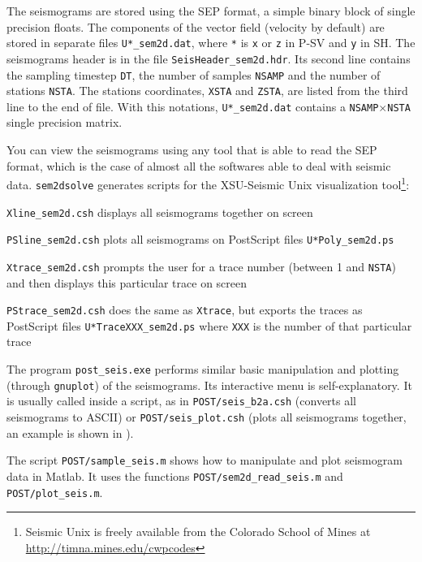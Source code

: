 The seismograms are stored using the SEP format, a simple
binary block of single precision floats. The components 
of the vector field (velocity by default) are stored
in separate files \texttt{U*\_sem2d.dat},
where \texttt{*} is \texttt{x} or \texttt{z} in P-SV 
and \texttt{y} in SH.
The seismograms header is in the file \texttt{SeisHeader\_sem2d.hdr}.
Its second line contains the sampling timestep \texttt{DT}, the
number of samples \texttt{NSAMP} and the number of stations \texttt{NSTA}.
The stations coordinates, \texttt{XSTA} and \texttt{ZSTA}, are listed
from the third line to the end of file.
With this notations, \texttt{U*\_sem2d.dat} contains a 
\texttt{NSAMP}$\times$\texttt{NSTA} single precision matrix.

You can view the seismograms using any tool
that is able to read the SEP format, which is the case of almost
all the softwares able to deal with seismic data.
\texttt{sem2dsolve} generates scripts for the 
XSU-Seismic Unix visualization tool\footnote{Seismic Unix is freely available from the Colorado 
School of Mines at \url{http://timna.mines.edu/cwpcodes}}:

\begin{sitemize}
\item \texttt{Xline\_sem2d.csh} displays all seismograms together on screen
\item \texttt{PSline\_sem2d.csh} plots all seismograms
on PostScript files \texttt{U*Poly\_sem2d.ps}
\item \texttt{Xtrace\_sem2d.csh} prompts the user for a trace number
(between 1 and \texttt{NSTA})
and then displays this particular trace on screen
\item \texttt{PStrace\_sem2d.csh} does the same as \texttt{Xtrace},
but exports the traces as PostScript files \texttt{U*TraceXXX\_sem2d.ps} 
where \texttt{XXX} is the number of that particular trace
\end{sitemize}

The program \texttt{post\_seis.exe} performs similar
basic manipulation and plotting (through \texttt{gnuplot}) of the 
seismograms. Its interactive menu is self-explanatory.
It is usually called inside a script, as in \texttt{POST/seis\_b2a.csh}
(converts all seismograms to ASCII) or \texttt{POST/seis\_plot.csh}
(plots all seismograms together, an example is shown in ).

The script \texttt{POST/sample\_seis.m} shows how
to manipulate and plot seismogram data in Matlab.
It uses the functions \texttt{POST/sem2d\_read\_seis.m} and \texttt{POST/plot\_seis.m}.

